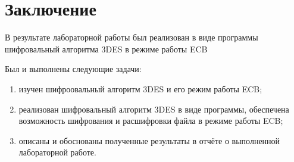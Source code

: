 \chapter*{Заключение}

В результате лабораторной работы был реализован в виде программы шифровальный алгоритма 3DES в режиме работы ECB 

Был и выполнены следующие задачи:
\begin{enumerate}[label=\arabic*)]
	\item изучен шифроовальный алгоритм  3DES и его режим работы ECB;
	\item реализован шифровальный алгоритм 3DES в виде программы, обеспечена возможность шифрования и расшифровки файла в режиме работы ECB;
	\item описаны и обоснованы полученные результаты в отчёте о выполненной лабораторной работе.
\end{enumerate}

